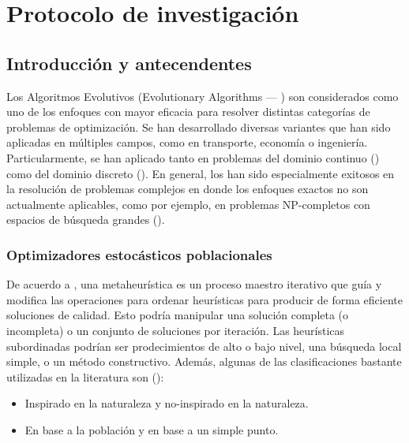 \chapter{Protocolo de investigación}

\section{Introducción y antecendentes}
Los Algoritmos Evolutivos (Evolutionary Algorithms --- \EAS{}) son considerados como uno de los enfoques con mayor eficacia para resolver distintas categorías de 
problemas de optimización.
%
Se han desarrollado diversas variantes que han sido aplicadas en múltiples campos, como en transporte, economía o ingeniería.
%
Particularmente, se han aplicado tanto en problemas del dominio continuo (\cite{glover2005handbook}) como del dominio discreto (\cite{Joel:Dynamic_FAP}).
%
En general, los \EAS{} han sido especialmente exitosos en la resolución de problemas complejos en donde los enfoques exactos no son actualmente aplicables, como por ejemplo, en problemas NP-completos con espacios de búsqueda grandes (\cite{chakraborty2008advances}).
% 
\subsection{Optimizadores estocásticos poblacionales}

De acuerdo a \cite{voss2012meta}, una metaheurística es un proceso maestro iterativo que guía y modifica las operaciones para ordenar heurísticas para producir de forma eficiente soluciones de calidad. 
%
Esto podría manipular una solución completa (o incompleta) o un conjunto de soluciones por iteración.
%
Las heurísticas subordinadas podrían ser prodecimientos de alto o bajo nivel, una búsqueda local simple, o un método constructivo.
%
Además, algunas de las clasificaciones bastante utilizadas en la literatura son (\cite{beheshti2013review}):
\begin{itemize}
    \item Inspirado en la naturaleza y no-inspirado en la naturaleza.
    \item En base a la población y en base a un simple punto.
\end{itemize}

